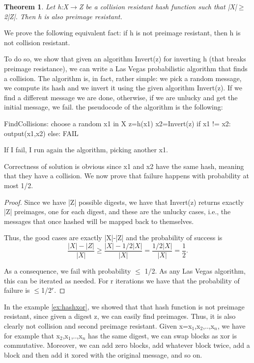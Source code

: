\documentclass[a4paper, 12pt]{report}
\newtheorem{theorem}{\textbf{Theorem}}
\begin{document}
\begin{theorem}
	Let h:X$\rightarrow$Z be a collision resistant hash function such that |X|$\ge$2|Z|. Then h is also preimage resistant.
\end{theorem}
We prove the following equivalent fact: if h is not preimage resistant, then h is not collision resistant.

To do so, we show that given an algorithm Invert(z) for inverting h (that breaks preimage resistance), we can write a Las Vegas probabilistic algorithm that finds a collision. The algorithm is, in fact, rather simple: we pick a random message, we compute its hash and we invert it using the given algorithm Invert(z). If we find a different message we are done, otherwise, if we are unlucky and get the initial message, we fail. the pseudocode of the algorithm is the following:
\begin{python}
FindCollisions:
	choose a random x1 in X
	z=h(x1)
	x2=Invert(z)
	if x1 != x2:
		output(x1,x2)
	else:
		FAIL
\end{python}

If I fail, I run again the algorithm, picking another x1.

Correctness of solution is obvious since x1 and x2 have the same hash, meaning that they have a collision. We now prove that failure happens with probability at most 1/2.

\begin{proof}
	Since we have |Z| possible digests, we have that Invert(z) returns exactly |Z| preimages, one for each digest, and these are the unlucky cases, i.e., the messages that once hashed will be mapped back to themselves. 
	
	Thus, the good cases are exactly |X|-|Z| and the probability of success is
	\[\frac{|X|-|Z|}{|X|}\ge\frac{|X|-1/2|X|}{|X|}=\frac{1/2|X|}{|X|}=\frac{1}{2}.\]
	
	As a consequence, we fail with probability $\le$ 1/2. As any Las Vegas algorithm, this can be iterated as needed. For r iterations we have that the probability of failure is $\le$1/2$^r$.
\end{proof}

In the example \ref{ex:hashxor}, we showed that that hash function is not preimage resistant, since given a digest z, we can easily find preimages. Thus, it is also clearly not collision and second preimage resistant. Given x=x$_1$,x$_2$,..,x$_n$, we have for example that x$_2$,x$_1$,..,x$_n$ has the same digest, we can swap blocks as xor is commutative. Moreover, we can add zero blocks, add whatever block twice, add a block and then add it xored with the original message, and so on.
\end{document}
